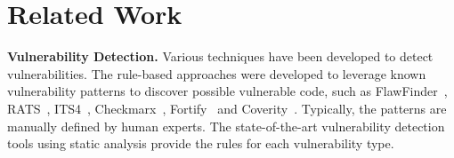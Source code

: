 \section{Related Work}
\label{sec:rw}

{\bf Vulnerability Detection.} Various techniques have been developed
to detect vulnerabilities.
The rule-based approaches were developed to leverage known vulnerability patterns to discover possible vulnerable code, such as FlawFinder~\cite{FlawFinder}, RATS~\cite{RATS}, ITS4~\cite{viega2000its4}, Checkmarx~\cite{Checkmarx}, Fortify~\cite{HPFortify} and Coverity~\cite{Coverity}.
Typically, the patterns are manually defined by human experts. The state-of-the-art vulnerability detection tools using static analysis provide the
rules for each vulnerability type.


